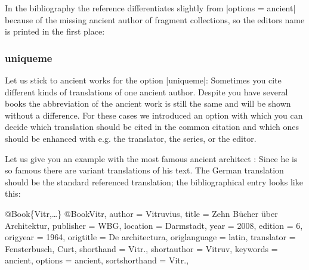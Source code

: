 \documentclass[a4paper,
10pt,
greek,
french,
spanish,
italian,
ngerman,
english
]{ltxdoc}
\begin{document}
In the bibliography the reference differentiates slightly from |options = {ancient}| because of the missing ancient author of fragment collections, 
so the editors name is printed in the first place:

\subsubsection{uniqueme}\label{uniqueme}
Let us stick to ancient works for the option |uniqueme|:
Sometimes you cite different kinds of translations of one ancient author.
Despite you have several books the abbreviation of the ancient work is still the same and will be shown without a difference. 
For these cases we introduced an option with which you can decide which translation should be cited in the common citation and which ones should be enhanced with e.g. the translator, the series, or the editor.

Let us give you an example with the most famous ancient architect \citeauthor{Vitr}:
Since he is so famous there are variant translations of his text.
The German translation should be the standard referenced translation;
the bibliographical entry looks like this:
\begin{bibexample}[label=Vitr]{{@}Book\{Vitr,…\}}
@Book{Vitr,
  author        = {Vitruvius},
  title         = {Zehn Bücher über Architektur},
  publisher     = WBG, %
  location      = {Darmstadt},
  year          = {2008},
  edition       = {6},
  origyear      = {1964},
  origtitle     = {De architectura},
  origlanguage  = {latin},
  translator    = {Fensterbusch, Curt},
  shorthand     = {Vitr.},
  shortauthor   = {Vitruv},
  keywords      = {ancient},
  options       = {ancient},
  sortshorthand = {Vitr.},
}
\end{bibexample}
\end{document}
